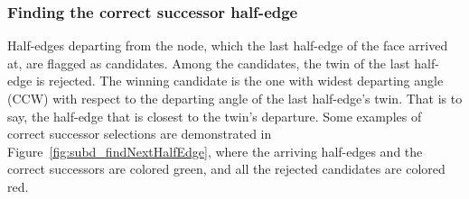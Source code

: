 \subsubsection{Finding the correct successor half-edge}

Half-edges departing from the node, which the last half-edge of the face arrived at, are flagged as candidates.
Among the candidates, the twin of the last half-edge is rejected.
The winning candidate is the one with widest departing angle (CCW) with respect to the departing angle of the last half-edge's twin.
That is to say, the half-edge that is closest to the twin's departure.
Some examples of correct successor selections are demonstrated in Figure~\ref{fig:subd_findNextHalfEdge}, where the arriving half-edges and the correct successors are colored green, and all the rejected candidates are colored red.


